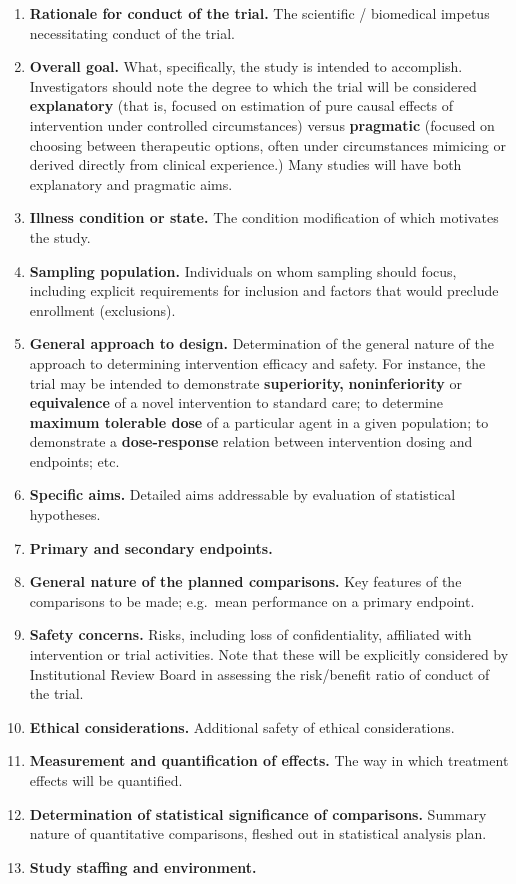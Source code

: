 \documentclass[]{book}
\providecommand{\tightlist}{%
  \setlength{\itemsep}{0pt}\setlength{\parskip}{0pt}}
\theoremstyle{definition}
\theoremstyle{definition}
\theoremstyle{definition}
\theoremstyle{remark}
\begin{document}
\begin{enumerate}
\def\labelenumi{\arabic{enumi}.}
\tightlist
\item
  \textbf{Rationale for conduct of the trial.} The scientific /
  biomedical impetus necessitating conduct of the trial.
\item
  \textbf{Overall goal.} What, specifically, the study is intended to
  accomplish. Investigators should note the degree to which the trial
  will be considered \textbf{explanatory} (that is, focused on
  estimation of pure causal effects of intervention under controlled
  circumstances) versus \textbf{pragmatic} (focused on choosing between
  therapeutic options, often under circumstances mimicing or derived
  directly from clinical experience.) Many studies will have both
  explanatory and pragmatic aims.
\item
  \textbf{Illness condition or state.} The condition modification of
  which motivates the study.
\item
  \textbf{Sampling population.} Individuals on whom sampling should
  focus, including explicit requirements for inclusion and factors that
  would preclude enrollment (exclusions).
\item
  \textbf{General approach to design.} Determination of the general
  nature of the approach to determining intervention efficacy and
  safety. For instance, the trial may be intended to demonstrate
  \textbf{superiority,} \textbf{noninferiority} or \textbf{equivalence}
  of a novel intervention to standard care; to determine \textbf{maximum
  tolerable dose} of a particular agent in a given population; to
  demonstrate a \textbf{dose-response} relation between intervention
  dosing and endpoints; etc.
\item
  \textbf{Specific aims.} Detailed aims addressable by evaluation of
  statistical hypotheses.
\item
  \textbf{Primary and secondary endpoints.}
\item
  \textbf{General nature of the planned comparisons.} Key features of
  the comparisons to be made; e.g.~mean performance on a primary
  endpoint.
\item
  \textbf{Safety concerns.} Risks, including loss of confidentiality,
  affiliated with intervention or trial activities. Note that these will
  be explicitly considered by Institutional Review Board in assessing
  the risk/benefit ratio of conduct of the trial.
\item
  \textbf{Ethical considerations.} Additional safety of ethical
  considerations.
\item
  \textbf{Measurement and quantification of effects.} The way in which
  treatment effects will be quantified.
\item
  \textbf{Determination of statistical significance of comparisons.}
  Summary nature of quantitative comparisons, fleshed out in statistical
  analysis plan.
\item
  \textbf{Study staffing and environment.}


\end{enumerate}
\end{document}

